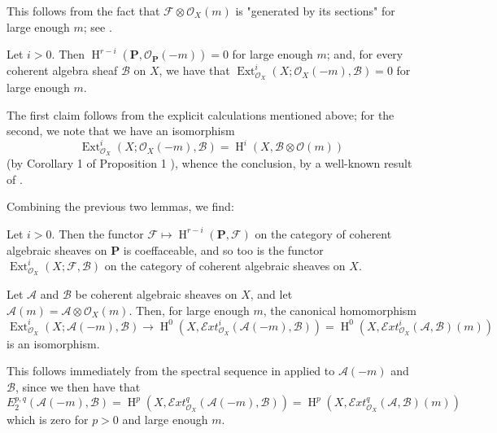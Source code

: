\begin{cproof}
  This follows from the fact that $\mathcal{F}\otimes\mathcal{O}_X(m)$ is "generated by its sections" for large enough $m$;
  see \cite{Ser1955}.
\end{cproof}


\begin{lemma}\label{fga1-lemma-4}
  Let $i>0$.
  Then $\operatorname{H}^{r-i}(\mathbf{P},\mathcal{O}_\mathbf{P}(-m))=0$ for large enough $m$;
  and, for every coherent algebra sheaf $\mathcal{B}$ on $X$, we have that $\operatorname{Ext}_{\mathcal{O}_X}^i(X;\mathcal{O}_X(-m),\mathcal{B})=0$ for large enough $m$.
\end{lemma}

\begin{cproof}
  The first claim follows from the explicit calculations mentioned above;
  for the second, we note that we have an isomorphism
  \[\operatorname{Ext}_{\mathcal{O}_X}^i(X;\mathcal{O}_X(-m),\mathcal{B}) = \operatorname{H}^i(X,\mathcal{B}\otimes\mathcal{O}(m))\]
  (by Corollary 1 of Proposition 1 ), whence the conclusion, by a well-known result of \cite{Ser1955}.
\end{cproof}


Combining the previous two lemmas, we find:

\begin{corollary}\label{fga1-lemma-3-and-4-corollary}
  Let $i>0$.
  Then the functor $\mathcal{F}\mapsto\operatorname{H}^{r-i}(\mathbf{P},\mathcal{F})$ on the category of coherent algebraic sheaves on $\mathbf{P}$ is coeffaceable, and so too is the functor $\operatorname{Ext}_{\mathcal{O}_X}^i(X;\mathcal{F},\mathcal{B})$ on the category of coherent algebraic sheaves on $X$.
\end{corollary}


\begin{lemma}\label{fga1-lemma-5}
  Let $\mathcal{A}$ and $\mathcal{B}$ be coherent algebraic sheaves on $X$, and let $\mathcal{A}(m)=\mathcal{A}\otimes\mathcal{O}_X(m)$.
  Then, for large enough $m$, the canonical homomorphism
  \[
  \operatorname{Ext}_{\mathcal{O}_X}^i(X;\mathcal{A}(-m),\mathcal{B})
  \to \operatorname{H}^0(X,\mathcal{E}xt_{\mathcal{O}_X}^i(\mathcal{A}(-m),\mathcal{B}))
  = \operatorname{H}^0(X,\mathcal{E}xt_{\mathcal{O}_X}^i(\mathcal{A},\mathcal{B})(m))
  \]
  is an isomorphism.
\end{lemma}
\begin{cproof}

  This follows immediately from the spectral sequence in  applied to $\mathcal{A}(-m)$ and $\mathcal{B}$, since we then have that
  \[
  E_2^{p,q}(\mathcal{A}(-m),\mathcal{B})
  = \operatorname{H}^p(X,\mathcal{E}xt_{\mathcal{O}_X}^q(\mathcal{A}(-m),\mathcal{B}))
  = \operatorname{H}^p(X,\mathcal{E}xt_{\mathcal{O}_X}^q(\mathcal{A},\mathcal{B})(m))
  \]
  which is zero for $p>0$ and large enough $m$.
\end{cproof}


